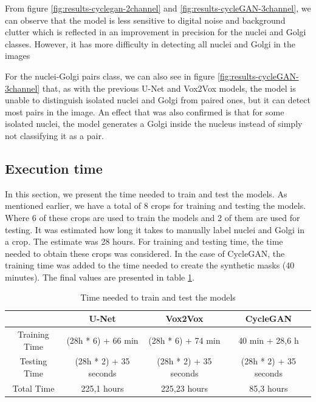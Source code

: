 From figure \ref{fig:results-cyclegan-2channel} and \ref{fig:results-cycleGAN-3channel}, we can observe that the model is less sensitive to digital noise and background clutter which is reflected in an improvement in precision for the nuclei and Golgi classes. However, it has more difficulty in detecting all nuclei and Golgi in the images 

For the nuclei-Golgi pairs class, we can also see in figure \ref{fig:results-cycleGAN-3channel} that, as with the previous U-Net and Vox2Vox models, the model is unable to distinguish isolated nuclei and Golgi from paired ones, but it can detect most pairs in the image. An effect that was also confirmed is that for some isolated nuclei, the model generates a Golgi inside the nucleus instead of simply not classifying it as a pair.

\subsection{Execution time}
\label{subsection:execution-time}

In this section, we present the time needed to train and test the models. As mentioned earlier, we have a total of 8 crops for training and testing the models. Where 6 of these crops are used to train the models and 2 of them are used for testing. It was estimated how long it takes to manually label nuclei and Golgi in a crop. The estimate was 28 hours. For training and testing time, the time needed to obtain these crops was considered. In the case of CycleGAN, the training time was added to the time needed to create the synthetic masks (40 minutes). The final values are presented in table \ref{tab:time}.

\begin{table}[!htb]
\centering
\caption{Time needed to train and test the models}
\label{tab:time}
\renewcommand\arraystretch{1.4}
\begin{tabular}{c|c|c|c|}
\cline{2-4}
                                    & U-Net                  & Vox2Vox                & CycleGAN               \\ \hline
\multicolumn{1}{|c|}{Training Time} & (28h * 6) + 66 min     & (28h * 6) + 74 min     & 40 min + 28,6 h        \\ \hline
\multicolumn{1}{|c|}{Testing Time}  & (28h * 2) + 35 seconds & (28h * 2) + 35 seconds & (28h * 2) + 35 seconds \\ \hline
\multicolumn{1}{|c|}{Total Time}    & 225,1 hours            & 225,23 hours           & 85,3 hours             \\ \hline
\end{tabular}
\end{table}



